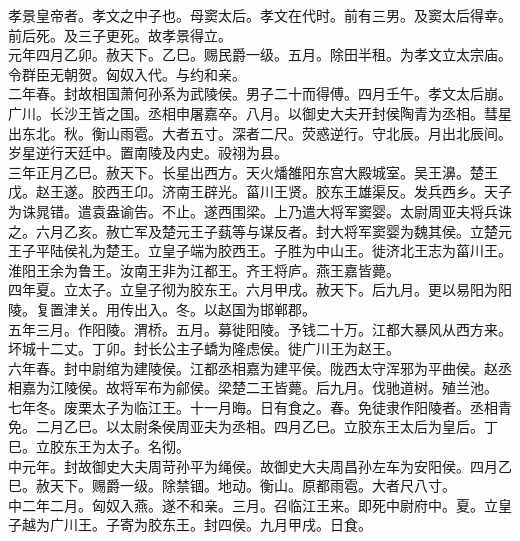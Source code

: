 \documentclass{zhvt-classic}
\begin{document}

\hspace*{2em}孝景皇帝者。孝文之中子也。母窦太后。孝文在代时。前有三男。及窦太后得幸。前后死。及三子更死。故孝景得立。\\
\hspace*{2em}元年四月乙卯。赦天下。乙巳。赐民爵一级。五月。除田半租。为孝文立太宗庙。令群臣无朝贺。匈奴入代。与约和亲。\\
\hspace*{2em}二年春。封故相国萧何孙系为武陵侯。男子二十而得傅。四月壬午。孝文太后崩。广川。长沙王皆之国。丞相申屠嘉卒。八月。以御史大夫开封侯陶青为丞相。彗星出东北。秋。衡山雨雹。大者五寸。深者二尺。荧惑逆行。守北辰。月出北辰间。岁星逆行天廷中。置南陵及内史。祋祤为县。\\
\hspace*{2em}三年正月乙巳。赦天下。长星出西方。天火燔雒阳东宫大殿城室。吴王濞。楚王戊。赵王遂。胶西王卬。济南王辟光。菑川王贤。胶东王雄渠反。发兵西乡。天子为诛晁错。遣袁盎谕告。不止。遂西围梁。上乃遣大将军窦婴。太尉周亚夫将兵诛之。六月乙亥。赦亡军及楚元王子蓺等与谋反者。封大将军窦婴为魏其侯。立楚元王子平陆侯礼为楚王。立皇子端为胶西王。子胜为中山王。徙济北王志为菑川王。淮阳王余为鲁王。汝南王非为江都王。齐王将庐。燕王嘉皆薨。\\
\hspace*{2em}四年夏。立太子。立皇子彻为胶东王。六月甲戌。赦天下。后九月。更以易阳为阳陵。复置津关。用传出入。冬。以赵国为邯郸郡。\\
\hspace*{2em}五年三月。作阳陵。渭桥。五月。募徙阳陵。予钱二十万。江都大暴风从西方来。坏城十二丈。丁卯。封长公主子蟜为隆虑侯。徙广川王为赵王。\\
\hspace*{2em}六年春。封中尉绾为建陵侯。江都丞相嘉为建平侯。陇西太守浑邪为平曲侯。赵丞相嘉为江陵侯。故将军布为鄃侯。梁楚二王皆薨。后九月。伐驰道树。殖兰池。\\
\hspace*{2em}七年冬。废栗太子为临江王。十一月晦。日有食之。春。免徒隶作阳陵者。丞相青免。二月乙巳。以太尉条侯周亚夫为丞相。四月乙巳。立胶东王太后为皇后。丁巳。立胶东王为太子。名彻。\\
\hspace*{2em}中元年。封故御史大夫周苛孙平为绳侯。故御史大夫周昌孙左车为安阳侯。四月乙巳。赦天下。赐爵一级。除禁锢。地动。衡山。原都雨雹。大者尺八寸。\\
\hspace*{2em}中二年二月。匈奴入燕。遂不和亲。三月。召临江王来。即死中尉府中。夏。立皇子越为广川王。子寄为胶东王。封四侯。九月甲戌。日食。\\
\end{document}
